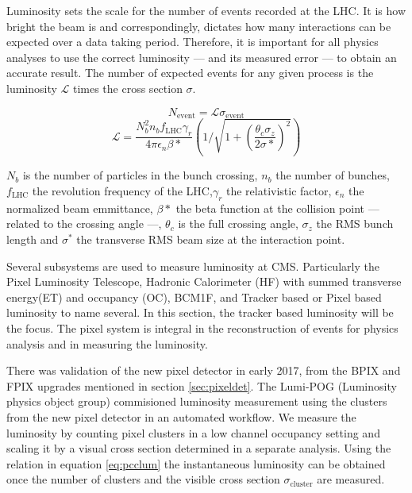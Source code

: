 Luminosity sets the scale for the number of events recorded at the LHC. It is how bright the beam is and correspondingly, dictates how many interactions can be expected over a data taking period. Therefore, it is important for all physics analyses to use the correct luminosity --- and its measured error --- to obtain an accurate result. The number of expected events for any given process is the luminosity $\mathcal{L}$ times the cross section $\sigma$.  

\begin{equation}
N_{\text{event}} = \mathcal{L} \sigma_{\text{event}}
\end{equation}
\begin{equation}
\mathcal{L} = \frac{N_b^2 n_b f_\text{LHC} \gamma_r}{4\pi\epsilon_n \beta*}\left( 1 / \sqrt{1+ (\frac{\theta_c \sigma_z}{2\sigma*})^2} \right)
\end{equation}

$N_b$ is the number of particles in the bunch crossing, $n_b$ the number of bunches, $f_{\text{LHC}}$ the revolution frequency of the LHC,$\gamma_r$ the relativistic factor, $\epsilon_n$ the normalized beam emmittance, $\beta*$ the beta function at the collision point --- related to the crossing angle ---, $\theta_c$ is the full crossing angle, $\sigma_z$ the RMS bunch length and $\sigma^*$ the transverse RMS beam size at the interaction point.

Several subsystems are used to measure luminosity at CMS. Particularly the Pixel Luminosity Telescope, Hadronic Calorimeter (HF) with summed transverse energy(ET) and occupancy (OC), BCM1F, and Tracker based or Pixel based luminosity to name several. 
In this section, the tracker based luminosity will be the focus. The pixel system is integral in the reconstruction of events for physics analysis and in measuring the luminosity.

There was validation of the new pixel detector in early 2017, from the BPIX and FPIX upgrades mentioned in section \ref{sec:pixeldet}. The Lumi-POG (Luminosity physics object group) commisioned luminosity measurement using the clusters from the new pixel detector in an automated workflow. 
We measure the luminosity by counting pixel clusters in a low channel occupancy setting and scaling it by a visual cross section determined in a separate analysis. Using the relation in equation \ref{eq:pcclum} the instantaneous luminosity can be obtained once the number of clusters and the visible cross section $\sigma_\text{cluster}$ are measured. 

